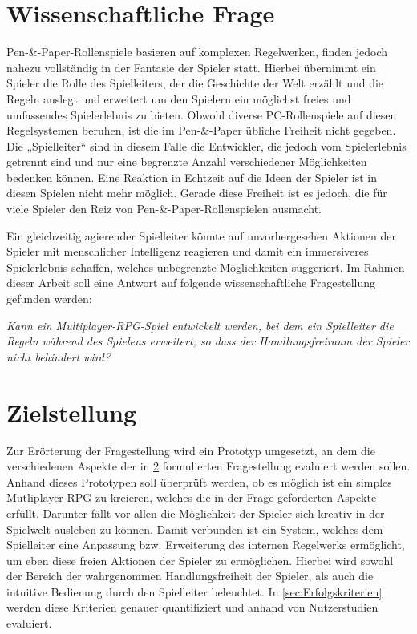 \section{Wissenschaftliche Frage}
\label{sec:WissenschaftlicheFrage}

Pen-\&-Paper-Rollenspiele basieren auf komplexen Regelwerken, finden jedoch nahezu vollständig in der Fantasie der Spieler statt. Hierbei übernimmt ein Spieler die Rolle des Spielleiters, der die Geschichte der Welt erzählt und die Regeln auslegt und erweitert um den Spielern ein möglichst freies und umfassendes Spielerlebnis zu bieten. Obwohl diverse PC-Rollenspiele auf diesen Regelsystemen beruhen, ist die im Pen-\&-Paper übliche Freiheit nicht gegeben. Die „Spielleiter“ sind in diesem Falle die Entwickler, die jedoch vom Spielerlebnis getrennt sind und nur eine begrenzte Anzahl verschiedener Möglichkeiten bedenken können. Eine Reaktion in Echtzeit auf die Ideen der Spieler ist in diesen Spielen nicht mehr möglich. Gerade diese Freiheit ist es jedoch, die für viele Spieler den Reiz von Pen-\&-Paper-Rollenspielen ausmacht.

Ein gleichzeitig agierender Spielleiter könnte auf unvorhergesehen Aktionen der Spieler mit menschlicher Intelligenz reagieren und damit ein immersiveres Spielerlebnis schaffen, welches unbegrenzte Möglichkeiten suggeriert.
Im Rahmen dieser Arbeit soll eine Antwort auf folgende wissenschaftliche Fragestellung gefunden werden:
\vspace*{0.5em}\begin{center}\parbox{0.9\linewidth}{
  \emph{Kann ein Multiplayer-RPG-Spiel entwickelt werden, bei dem ein Spielleiter die Regeln während des Spielens erweitert, so dass der Handlungsfreiraum der Spieler nicht behindert wird?}
} \end{center}\vspace*{0.5em}

\section{Zielstellung}
\label{sec:Zielstellung}

Zur Erörterung der Fragestellung wird ein Prototyp umgesetzt, an dem die verschiedenen Aspekte der in \ref{sec:Zielstellung} formulierten Fragestellung evaluiert werden sollen. Anhand dieses Prototypen soll überprüft werden, ob es möglich ist ein simples Mutliplayer-RPG zu kreieren, welches die in der Frage geforderten Aspekte erfüllt. Darunter fällt vor allen die Möglichkeit der Spieler sich kreativ in der Spielwelt ausleben zu können. Damit verbunden ist ein System, welches dem Spielleiter eine Anpassung bzw. Erweiterung des internen Regelwerks ermöglicht, um eben diese freien Aktionen der Spieler zu ermöglichen. Hierbei wird sowohl der Bereich der wahrgenommen Handlungsfreiheit der Spieler, als auch die intuitive Bedienung durch den Spielleiter beleuchtet. In \ref{sec:Erfolgskriterien} werden diese Kriterien genauer quantifiziert und anhand von Nutzerstudien evaluiert. 

